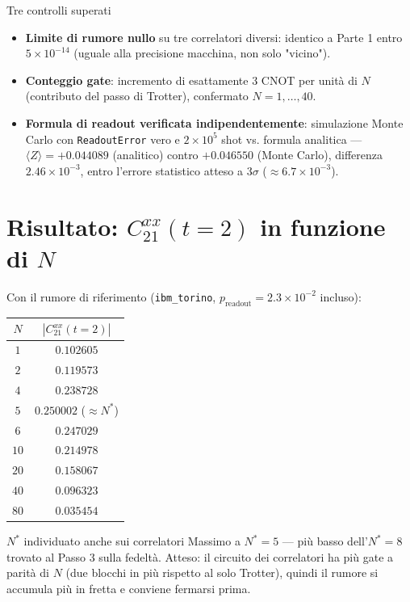 \documentclass[11pt,a4paper]{article}
\begin{document}
\begin{okbox}{Tre controlli superati}
\begin{itemize}[leftmargin=1.2em,itemsep=0.2em]
\item \textbf{Limite di rumore nullo} su tre correlatori diversi: identico
a Parte 1 entro $5\times10^{-14}$ (uguale alla precisione macchina, non
solo "vicino").
\item \textbf{Conteggio gate}: incremento di esattamente 3 CNOT per unità
di $N$ (contributo del passo di Trotter), confermato $N=1,\dots,40$.
\item \textbf{Formula di readout verificata indipendentemente}: simulazione
Monte Carlo con \texttt{ReadoutError} vero e $2\times10^5$ shot vs. formula
analitica --- $\langle Z\rangle=+0.044089$ (analitico) contro $+0.046550$
(Monte Carlo), differenza $2.46\times10^{-3}$, entro l'errore statistico
atteso a $3\sigma$ ($\approx6.7\times10^{-3}$).
\end{itemize}
\end{okbox}

\section*{Risultato: $C_{21}^{xx}(t=2)$ in funzione di $N$}

Con il rumore di riferimento (\texttt{ibm\_torino}, $p_\text{readout}=2.3\times10^{-2}$
incluso):

\begin{center}
\renewcommand{\arraystretch}{1.2}
\begin{tabular}{@{}cc@{}}
\toprule
$N$ & $|C_{21}^{xx}(t=2)|$ \\
\midrule
$1$ & $0.102605$ \\
$2$ & $0.119573$ \\
$4$ & $0.238728$ \\
$5$ & $0.250002$ \quad ($\approx N^*$) \\
$6$ & $0.247029$ \\
$10$ & $0.214978$ \\
$20$ & $0.158067$ \\
$40$ & $0.096323$ \\
$80$ & $0.035454$ \\
\bottomrule
\end{tabular}
\end{center}

\begin{okbox}{$N^*$ individuato anche sui correlatori}
Massimo a $N^*=5$ --- più basso dell'$N^*=8$ trovato al Passo 3 sulla
fedeltà. Atteso: il circuito dei correlatori ha più gate a parità di $N$
(due blocchi in più rispetto al solo Trotter), quindi il rumore si
accumula più in fretta e conviene fermarsi prima.
\end{okbox}
\end{document}

